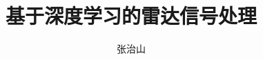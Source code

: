 \documentclass[twoside]{nputhesis}
\title[Radar Signal Process Based on Deep Learning]{基于深度学习的雷达信号处理}
\author[Zhishan Zhang]{张治山}
\begin{document}
\makecover
\frontmatter





\tableofcontents

\mainmatter







\backmatter



\Appendix



\Thanks



\Work



\statement
\end{document}
